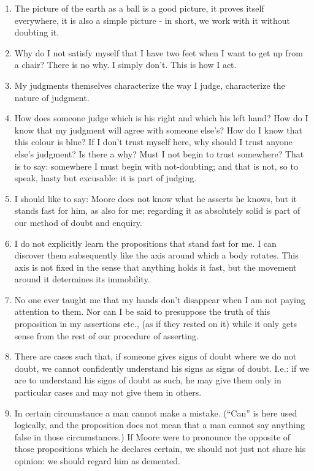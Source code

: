 \documentclass{book}
\begin{document}
\begin{enumerate}
\item
The picture of the earth as a ball is a good picture, it proves itself
everywhere, it is also a simple picture - in short, we work with it without
doubting it.

\item
Why do I not satisfy myself that I have two feet when I want to get up from a
chair? There is no why. I simply don't. This is how I act.

\item
My judgments themselves characterize the way I judge, characterize the nature
of judgment.

\item
How does someone judge which is his right and which his left hand? How do I
know that my judgment will agree with someone else's? How do I know that this
colour is blue? If I don't trust myself here, why should I trust anyone else's
judgment? Is there a why? Must I not begin to trust somewhere? That is to say:
somewhere I must begin with not-doubting; and that is not, so to speak, hasty
but excusable: it is part of judging.

\item
I should like to say: Moore does not know what he asserts he knows, but it
stands fast for him, as also for me; regarding it as absolutely solid is part
of our method of doubt and enquiry.

\item
I do not explicitly learn the propositions that stand fast for me. I can
discover them subsequently like the axis around which a body rotates. This axis
is not fixed in the sense that anything holds it fast, but the movement around
it determines its immobility.

\item
No one ever taught me that my hands don't disappear when I am not paying
attention to them. Nor can I be said to presuppose the truth of this
proposition in my assertions etc., (as if they rested on it) while it only gets
sense from the rest of our procedure of asserting.

\item
There are cases such that, if someone gives signs of doubt where we do not
doubt, we cannot confidently understand his signs as signs of doubt.  I.e.: if
we are to understand his signs of doubt as such, he may give them only in
particular cases and may not give them in others.

\item
In certain circumstance a man cannot make a mistake. (``Can'' is here used
logically, and the proposition does not mean that a man cannot say anything
false in those circumstances.) If Moore were to pronounce the opposite of those
propositions which he declares certain, we should not just not share his
opinion: we should regard him as demented.


\end{enumerate}
\end{document}
